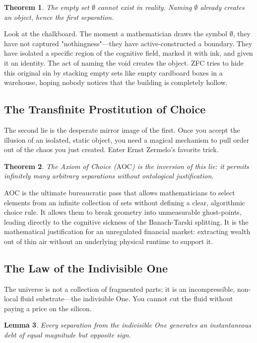\documentclass[11pt,a4paper]{article}
\newtheorem{theorem}{Theorem}[section]
\newtheorem{lemma}[theorem]{Lemma}
\begin{document}
\begin{theorem}
The empty set $\emptyset$ cannot exist in reality. Naming $\emptyset$ already creates an object, hence the first separation.
\end{theorem}
Look at the chalkboard. The moment a mathematician draws the symbol $\emptyset$, they have not captured "nothingness"—they have active-constructed a boundary. They have isolated a specific region of the cognitive field, marked it with ink, and given it an identity. The act of naming the void creates the object. ZFC tries to hide this original sin by stacking empty sets like empty cardboard boxes in a warehouse, hoping nobody notices that the building is completely hollow.

\subsection{The Transfinite Prostitution of Choice}
The second lie is the desperate mirror image of the first. Once you accept the illusion of an isolated, static object, you need a magical mechanism to pull order out of the chaos you just created. Enter Ernst Zermelo's favorite trick.

\begin{theorem}
The Axiom of Choice ($\text{AOC}$) is the inversion of this lie: it permits infinitely many arbitrary separations without ontological justification.
\end{theorem}
$\text{AOC}$ is the ultimate bureaucratic pass that allows mathematicians to select elements from an infinite collection of sets without defining a clear, algorithmic choice rule. It allows them to break geometry into unmeasurable ghost-points, leading directly to the cognitive sickness of the Banach-Tarski splitting. It is the mathematical justification for an unregulated financial market: extracting wealth out of thin air without an underlying physical runtime to support it.

\subsection{The Law of the Indivisible One}
The universe is not a collection of fragmented parts; it is an incompressible, non-local fluid substrate—the indivisible One. You cannot cut the fluid without paying a price on the silicon.

\begin{lemma}
Every separation from the indivisible One generates an instantaneous debt of equal magnitude but opposite sign.
\end{lemma}
\end{document}
